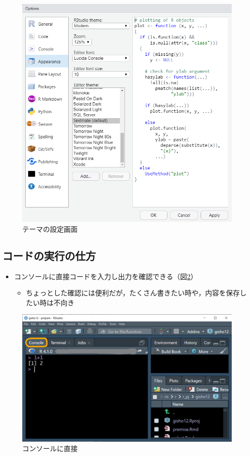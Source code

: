 \documentclass[
  xelatex,ja=standard, b5paper]{bxjsbook}
\providecommand{\tightlist}{%
  \setlength{\itemsep}{0pt}\setlength{\parskip}{0pt}}
\begin{document}
\begin{figure}

{\centering \includegraphics[width=0.7\linewidth]{images/appearance} 

}

\caption{テーマの設定画面}\label{fig:appearance}
\end{figure}

\hypertarget{p-howtorun}{%
\subsection{コードの実行の仕方}\label{p-howtorun}}

\begin{itemize}
\tightlist
\item
  コンソールに直接コードを入力し出力を確認できる（図\ref{fig:pane}）

  \begin{itemize}
  \tightlist
  \item
    ちょっとした確認には便利だが，たくさん書きたい時や，内容を保存したい時は不向き
  \end{itemize}
\end{itemize}

\begin{figure}

{\centering \includegraphics[width=0.7\linewidth]{images/pane} 

}

\caption{コンソールに直接}\label{fig:pane}
\end{figure}
\end{document}
